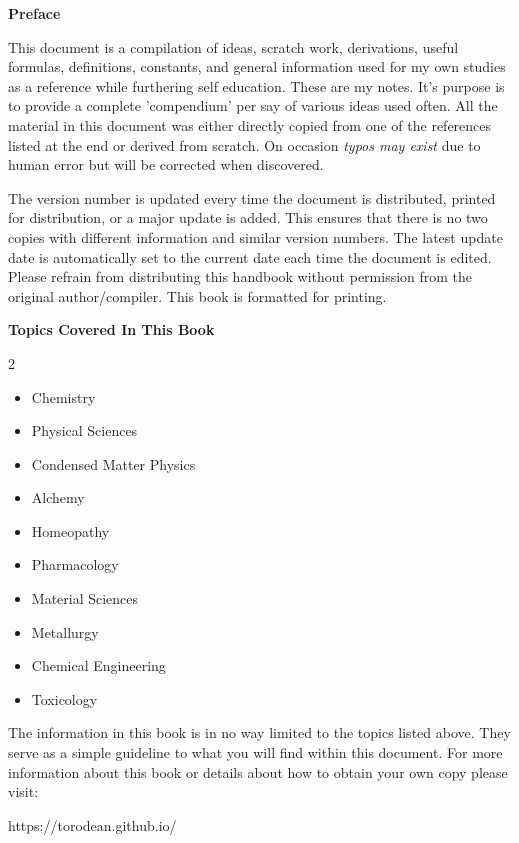 \begin{center}
	\textbf{Preface}
\end{center}

This document is a compilation of ideas, scratch work, derivations, useful formulas, definitions, constants, and general information used for my own studies as a reference while furthering self education. These are my notes. It's purpose is to provide a complete 'compendium' per say of various ideas used often. All the material in this document was either directly copied from one of the references listed at the end or derived from scratch. On occasion \textit{typos may exist} due to human error but will be corrected when discovered.
	
The version number is updated every time the document is distributed, printed for distribution, or a major update is added. This ensures that there is no two copies with different information and similar version numbers. The latest update date is automatically set to the current date each time the document is edited. Please refrain from distributing this handbook without permission from the original author/compiler. This book is formatted for printing.

\begin{center}
	\textbf{Topics Covered In This Book}
\end{center}

\begin{multicols}{2}
\begin{itemize}
	\item Chemistry
	\item Physical Sciences
	\item Condensed Matter Physics
	\item Alchemy
	\item Homeopathy
	\item Pharmacology
	\item Material Sciences
	\item Metallurgy
	\item Chemical Engineering
	\item Toxicology
\end{itemize} 
\end{multicols}

The information in this book is in no way limited to the topics listed above. They serve as a simple guideline to what you will find within this document. For more information about this book or details about how to obtain your own copy please visit:
\begin{center}
	https://torodean.github.io/
\end{center}

